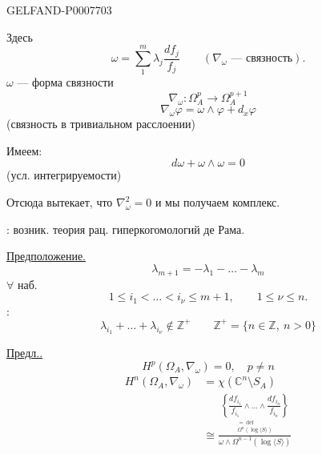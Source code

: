 \begin{GelfandAdjacentEvidence}{GELFAND-P000770}{3}


Здесь
\[
\omega=\sum_{1}^{m}\lambda_j\frac{df_j}{f_j}
\qquad(\nabla_\omega\text{ --- связность}).
\]
\(\omega\) --- форма связности
\[
\nabla_\omega:\Omega_A^p\longrightarrow\Omega_A^{p+1}
\]
\[
\nabla_\omega\varphi=\omega\wedge\varphi+d_x\varphi
\]
(связность в тривиальном расслоении)

Имеем:
\[
d\omega+\omega\wedge\omega=0
\]
(усл. интегрируемости)

Отсюда вытекает, что \(\nabla_\omega^2=0\) и мы получаем комплекс.

: возник. теория рац. гиперкогомологий де Рама.

\underline{Предположение.}
\[
\lambda_{m+1}=-\lambda_1-\ldots-\lambda_m
\]
\(\forall\) наб.
\[
1\le i_1<\ldots<i_\nu\le m+1,\qquad1\le\nu\le n.
\]
:
\[
\lambda_{i_1}+\ldots+\lambda_{i_\nu}\notin\mathbb Z^+
\qquad
\mathbb Z^+=\{n\in\mathbb Z,\ n>0\}
\]

\underline{Предл..}
\[
H^p(\Omega_A,\nabla_\omega)=0,\quad p\ne n
\]
\[
\begin{aligned}
H^n(\Omega_A,\nabla_\omega)
&=\chi(\mathbb C^n\setminus S_A)\\
&\cong\frac{
\underset{\substack{=\ \mathrm{def}\\\Omega^n(\log\langle S\rangle)}}{
\left\{\dfrac{df_{i_1}}{f_{i_1}}\wedge\ldots\wedge\dfrac{df_{i_n}}{f_{i_n}}\right\}}
}{\omega\wedge\Omega^{n-1}(\log\langle S\rangle)}
\end{aligned}
\]
\end{GelfandAdjacentEvidence}



